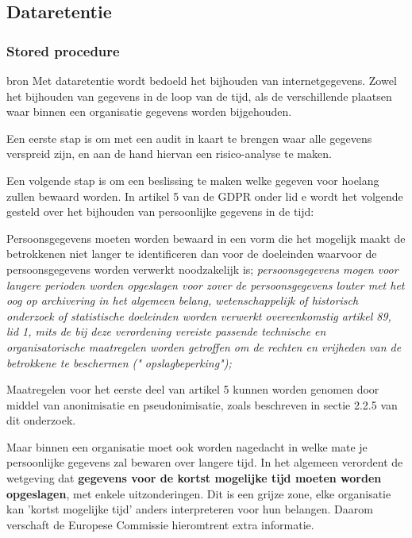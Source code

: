\subsection{Dataretentie}
\subsubsection{Stored procedure}
bron %
Met dataretentie wordt bedoeld het bijhouden van internetgegevens. Zowel het bijhouden van gegevens in de loop van de tijd, als de verschillende plaatsen waar binnen een organisatie gegevens worden bijgehouden.

Een eerste stap is om met een audit in kaart te brengen waar alle gegevens verspreid zijn, en aan de hand hiervan een risico-analyse te maken. 

Een volgende stap is om een beslissing te maken welke gegeven voor hoelang zullen bewaard worden. 
In artikel 5 van de GDPR onder lid e wordt het volgende gesteld over het bijhouden van persoonlijke gegevens in de tijd:

Persoonsgegevens moeten worden bewaard in een vorm die het mogelijk maakt de betrokkenen niet langer te identificeren dan voor de doeleinden waarvoor de persoonsgegevens worden verwerkt noodzakelijk is; \textit{persoonsgegevens mogen voor langere perioden worden opgeslagen voor zover de persoonsgegevens louter met het oog op archivering in het algemeen belang, wetenschappelijk of historisch onderzoek of statistische doeleinden worden verwerkt overeenkomstig artikel 89, lid 1, mits de bij deze verordening vereiste passende technische en organisatorische maatregelen worden getroffen om de rechten en vrijheden van de betrokkene te beschermen (" opslagbeperking");}

Maatregelen voor het eerste deel van artikel 5 kunnen worden genomen door middel van anonimisatie en pseudonimisatie, zoals beschreven in sectie 2.2.5 van dit onderzoek. 

Maar binnen een organisatie moet ook worden nagedacht in welke mate je persoonlijke gegevens zal bewaren over langere tijd. In het algemeen verordent de wetgeving dat \textbf{gegevens voor de kortst mogelijke tijd moeten worden opgeslagen}, met enkele uitzonderingen. Dit is een grijze zone, elke organisatie kan 'kortst mogelijke tijd' anders interpreteren voor hun belangen. Daarom verschaft de Europese Commissie hieromtrent extra informatie. 

